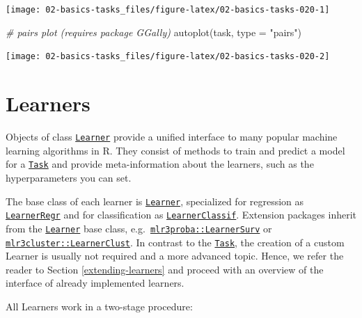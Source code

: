 \documentclass[
]{scrbook}
\newenvironment{Shaded}{\begin{snugshade}}{\end{snugshade}}
\newcommand{\AttributeTok}[1]{\textcolor[rgb]{0.77,0.63,0.00}{#1}}
\newcommand{\CommentTok}[1]{\textcolor[rgb]{0.56,0.35,0.01}{\textit{#1}}}
\newcommand{\FunctionTok}[1]{\textcolor[rgb]{0.00,0.00,0.00}{#1}}
\newcommand{\NormalTok}[1]{#1}
\newcommand{\StringTok}[1]{\textcolor[rgb]{0.31,0.60,0.02}{#1}}
\renewenvironment{Shaded} {\begin{snugshade}\small} {\end{snugshade}}
\begin{document}
\begin{center}\texttt{[image: 02-basics-tasks\_files/figure-latex/02-basics-tasks-020-1]} \end{center}

\begin{Shaded}
\begin{Highlighting}[]
\CommentTok{\# pairs plot (requires package GGally)}
\FunctionTok{autoplot}\NormalTok{(task, }\AttributeTok{type =} \StringTok{"pairs"}\NormalTok{)}
\end{Highlighting}
\end{Shaded}

\begin{center}\texttt{[image: 02-basics-tasks\_files/figure-latex/02-basics-tasks-020-2]} \end{center}

\hypertarget{learners}{%
\section{Learners}\label{learners}}

Objects of class \href{https://mlr3.mlr-org.com/reference/Learner.html}{\texttt{Learner}} provide a unified interface to many popular machine learning algorithms in R.
They consist of methods to train and predict a model for a \href{https://mlr3.mlr-org.com/reference/Task.html}{\texttt{Task}} and provide meta-information about the learners, such as the hyperparameters you can set.

The base class of each learner is \href{https://mlr3.mlr-org.com/reference/Learner.html}{\texttt{Learner}}, specialized for regression as \href{https://mlr3.mlr-org.com/reference/LearnerRegr.html}{\texttt{LearnerRegr}} and for classification as \href{https://mlr3.mlr-org.com/reference/LearnerClassif.html}{\texttt{LearnerClassif}}.
Extension packages inherit from the \href{https://mlr3.mlr-org.com/reference/Learner.html}{\texttt{Learner}} base class, e.g.~\href{https://mlr3proba.mlr-org.com/reference/LearnerSurv.html}{\texttt{mlr3proba::LearnerSurv}} or \href{https://mlr3cluster.mlr-org.com/reference/LearnerClust.html}{\texttt{mlr3cluster::LearnerClust}}.
In contrast to the \href{https://mlr3.mlr-org.com/reference/Task.html}{\texttt{Task}}, the creation of a custom Learner is usually not required and a more advanced topic.
Hence, we refer the reader to Section \ref{extending-learners} and proceed with an overview of the interface of already implemented learners.

All Learners work in a two-stage procedure:
\end{document}
